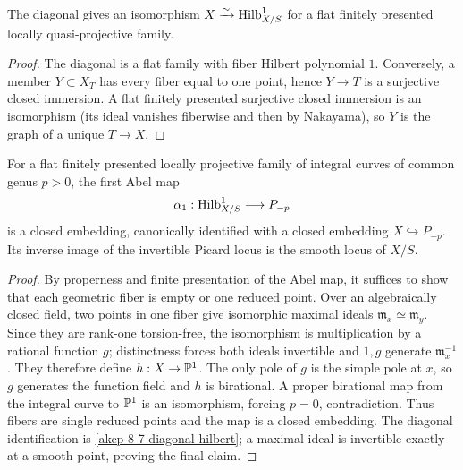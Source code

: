 \begin{lemma}
\label{akcp-8-7-diagonal-hilbert}
The diagonal gives an isomorphism $X\xrightarrow{\sim}\operatorname{Hilb}^1_{X/S}$ for a
flat finitely presented locally quasi-projective family.
\end{lemma}
\begin{proof}
The diagonal is a flat family with fiber Hilbert polynomial $1$.  Conversely,
a member $Y\subset X_T$ has every fiber equal to one point, hence
$Y\to T$ is a surjective closed immersion.  A flat finitely presented
surjective closed immersion is an isomorphism (its ideal vanishes fiberwise and
then by Nakayama), so $Y$ is the graph of a unique $T\to X$.
\end{proof}

\begin{theorem}
\label{akcp-8-8-first-abel}
For a flat finitely presented locally projective family of integral curves of
common genus $p>0$, the first Abel map
\[
\alpha_1:\operatorname{Hilb}^1_{X/S}\longrightarrow P_{-p}
\]
is a closed embedding, canonically identified with a closed embedding
$X\hookrightarrow P_{-p}$.  Its inverse image of the invertible Picard locus is
the smooth locus of $X/S$.
\end{theorem}
\begin{proof}
By properness and finite presentation of the Abel map, it suffices to show that
each geometric fiber is empty or one reduced point.  Over an algebraically
closed field, two points in one fiber give isomorphic maximal ideals
$\mathfrak m_x\simeq\mathfrak m_y$.  Since they are rank-one torsion-free,
the isomorphism is multiplication by a rational function $g$; distinctness
forces both ideals invertible and $1,g$ generate $\mathfrak m_x^{-1}$.
They therefore define $h:X\to\mathbb P^1$.  The only pole of $g$ is the simple pole
at $x$, so $g$ generates the function field and $h$ is birational.  A proper
birational map from the integral curve to $\mathbb P^1$ is an isomorphism, forcing
$p=0$, contradiction.  Thus fibers are single reduced points and the map is
a closed embedding.  The diagonal identification is \cref{akcp-8-7-diagonal-hilbert};
a maximal ideal is invertible exactly at a smooth point, proving the final claim.
\end{proof}
